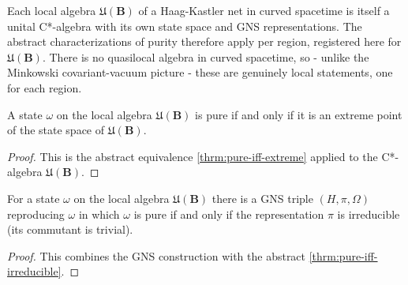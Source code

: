 Each local algebra $\mathfrak{U}(\mathbf{B})$ of a Haag-Kastler net in curved spacetime is itself a unital C*-algebra with its own state space and GNS representations. The abstract characterizations of purity therefore apply per region, registered here for $\mathfrak{U}(\mathbf{B})$. There is no quasilocal algebra in curved spacetime, so - unlike the Minkowski covariant-vacuum picture - these are genuinely local statements, one for each region.

\begin{theorem}
    \label{thrm:pure-iff-extreme-in-curved-spacetime}
    \leanok
    A state $\omega$ on the local algebra $\mathfrak{U}(\mathbf{B})$ is pure if and only if it is an extreme point of the state space of $\mathfrak{U}(\mathbf{B})$.
\end{theorem}
\begin{proof}
    \leanok
    This is the abstract equivalence \ref{thrm:pure-iff-extreme} applied to the C*-algebra $\mathfrak{U}(\mathbf{B})$.
\end{proof}

\begin{theorem}
    \label{thrm:pure-iff-irreducible-in-curved-spacetime}
    \leanok
    For a state $\omega$ on the local algebra $\mathfrak{U}(\mathbf{B})$ there is a GNS triple $(H, \pi, \Omega)$ reproducing $\omega$ in which $\omega$ is pure if and only if the representation $\pi$ is irreducible (its commutant is trivial).
\end{theorem}
\begin{proof}
    \leanok
    This combines the GNS construction with the abstract \ref{thrm:pure-iff-irreducible}.
\end{proof}

